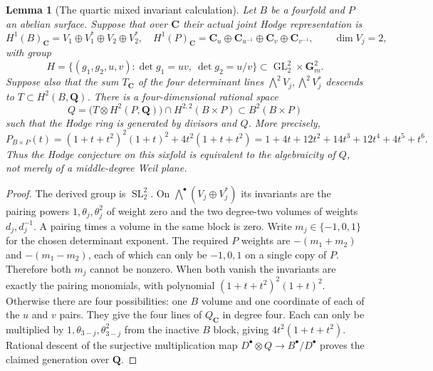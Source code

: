 \documentclass[10pt,reqno]{article}
\theoremstyle{emphasizedplain}
\newtheorem{lemma}[theorem]{Lemma}
\theoremstyle{emphasizeddefinition}
\theoremstyle{emphasizeddefinition}
\DeclareMathOperator{\GL}{GL}
\DeclareMathOperator{\SL}{SL}
\newcommand{\Q}{\mathbf Q}
\newcommand{\C}{\mathbf C}
\newcommand{\B}{B}
\newcommand{\D}{D}
\begin{document}
\begin{lemma}[The quartic mixed invariant calculation]\label{p:quartic-mixed}
Let $B$ be a fourfold and $P$ an abelian surface. Suppose that over
$\C$ their actual joint Hodge representation is
\[
 H^1(B)_\C=V_1\oplus V_1^*\oplus V_2\oplus V_2^*,\quad
 H^1(P)_\C=\C_u\oplus\C_{u^{-1}}\oplus\C_v\oplus\C_{v^{-1}},
 \qquad \dim V_j=2,
\]
with group
\[
 H=\{(g_1,g_2,u,v):\det g_1=uv,\ \det g_2=u/v\}
 \subset\GL_2^2\times\mathbf G_m^2.
\]
Suppose also that the sum $T_\C$ of the four determinant lines
$\bigwedge^2V_j,\bigwedge^2V_j^*$ descends to
$T\subset H^2(B,\Q)$. There is a four-dimensional rational space
\[
 Q=\bigl(T\otimes H^2(P,\Q)\bigr)\cap H^{2,2}(B\times P)
 \subset\B^2(B\times P)
\]
such that the Hodge ring is generated by divisors and $Q$. More precisely,
\[
 P_{B\times P}(t)=(1+t+t^2)^2(1+t)^2+4t^2(1+t+t^2)
 =1+4t+12t^2+14t^3+12t^4+4t^5+t^6.
\]
Thus the Hodge conjecture on this sixfold is equivalent to the
algebraicity of $Q$, not merely of a middle-degree Weil plane.
\end{lemma}
\begin{proof}
The derived group is $\SL_2^2$. On
$\bigwedge^\bullet(V_j\oplus V_j^*)$ its invariants are the
pairing powers $1,\theta_j,\theta_j^2$ of weight zero and the two
degree-two volumes of weights $d_j,d_j^{-1}$. A pairing times a
volume in the same block is zero. Write $m_j\in\{-1,0,1\}$ for
the chosen determinant exponent. The required $P$ weights are
$-(m_1+m_2)$ and $-(m_1-m_2)$, each of which can only be $-1,0,1$
on a single copy of $P$. Therefore both $m_j$ cannot be nonzero.
When both vanish the invariants are exactly the pairing monomials,
with polynomial $(1+t+t^2)^2(1+t)^2$. Otherwise there are four
possibilities: one $B$ volume and one coordinate of each of the
$u$ and $v$ pairs. They give the four lines of $Q_\C$ in degree four.
Each can only be multiplied by $1,\theta_{3-j},\theta_{3-j}^2$
from the inactive $B$ block, giving $4t^2(1+t+t^2)$.
Rational descent of the surjective multiplication map
$\D^\bullet\otimes Q\to\B^\bullet/\D^\bullet$
proves the claimed generation over $\Q$.
\end{proof}
\end{document}
